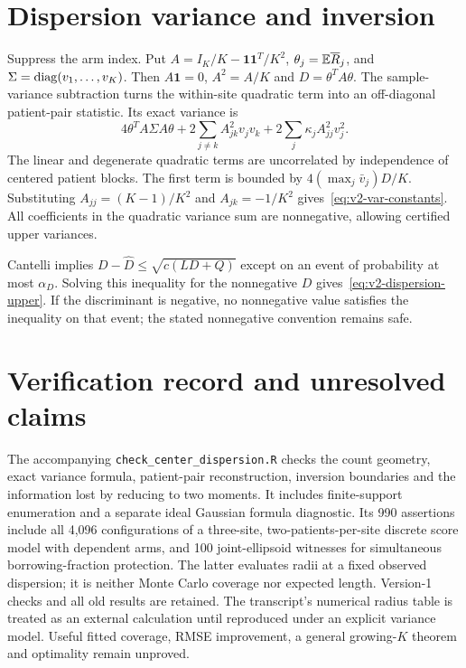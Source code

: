 \appendix
\section{Dispersion variance and inversion}\label{app:v2-variance}

Suppress the arm index. Put $A=I_K/K-\mathbf1\mathbf1^T/K^2$,
$\theta_j=\mathbb E\overline R_j$, and $\Sigma=\operatorname{diag}(v_1,\ldots,v_K)$.
Then $A\mathbf1=0$, $A^2=A/K$ and $D=\theta^TA\theta$.
The sample-variance subtraction turns the within-site quadratic term into
an off-diagonal patient-pair statistic. Its exact variance is
\[
 4\theta^TA\Sigma A\theta
 +2\sum_{j\ne k}A_{jk}^2v_jv_k
 +2\sum_j\kappa_j A_{jj}^2v_j^2.
\]
The linear and degenerate quadratic terms are uncorrelated by independence
of centered patient blocks. The first term is bounded by
$4(\max_j\bar v_j)D/K$. Substituting $A_{jj}=(K-1)/K^2$ and
$A_{jk}=-1/K^2$ gives~\eqref{eq:v2-var-constants}. All coefficients in the
quadratic variance sum are nonnegative, allowing certified upper variances.

Cantelli implies $D-\widehat D\le\sqrt{c(LD+Q)}$ except on an event of
probability at most $\alpha_D$. Solving this inequality for the nonnegative
$D$ gives~\eqref{eq:v2-dispersion-upper}. If the discriminant is negative,
no nonnegative value satisfies the inequality on that event; the stated
nonnegative convention remains safe.

\section{Verification record and unresolved claims}

The accompanying \texttt{check\_center\_dispersion.R} checks the count
geometry, exact variance formula, patient-pair reconstruction, inversion
boundaries and the information lost by reducing to two moments. It includes
finite-support enumeration and a separate ideal Gaussian formula diagnostic.
Its 990 assertions include all 4,096 configurations of a three-site,
two-patients-per-site discrete score model with dependent arms, and 100
joint-ellipsoid witnesses for simultaneous borrowing-fraction protection.
The latter evaluates radii at a fixed observed dispersion; it is neither
Monte Carlo coverage nor expected length. Version-1 checks and all old
results are retained. The transcript's numerical radius table is treated as
an external calculation until reproduced under an explicit variance model.
Useful fitted coverage, RMSE improvement, a general growing-$K$ theorem and
optimality remain unproved.
